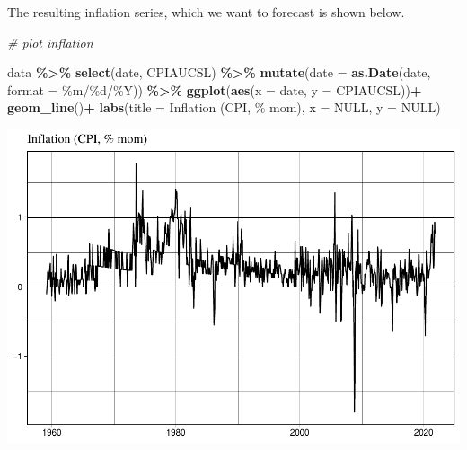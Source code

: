 \documentclass[
]{article}
\newenvironment{Shaded}{\begin{snugshade}}{\end{snugshade}}
\newcommand{\AttributeTok}[1]{\textcolor[rgb]{0.13,0.29,0.53}{#1}}
\newcommand{\CommentTok}[1]{\textcolor[rgb]{0.56,0.35,0.01}{\textit{#1}}}
\newcommand{\ConstantTok}[1]{\textcolor[rgb]{0.56,0.35,0.01}{#1}}
\newcommand{\DecValTok}[1]{\textcolor[rgb]{0.00,0.00,0.81}{#1}}
\newcommand{\FunctionTok}[1]{\textcolor[rgb]{0.13,0.29,0.53}{\textbf{#1}}}
\newcommand{\NormalTok}[1]{#1}
\newcommand{\OtherTok}[1]{\textcolor[rgb]{0.56,0.35,0.01}{#1}}
\newcommand{\SpecialCharTok}[1]{\textcolor[rgb]{0.81,0.36,0.00}{\textbf{#1}}}
\newcommand{\StringTok}[1]{\textcolor[rgb]{0.31,0.60,0.02}{#1}}
\begin{document}
\begin{Shaded}
\end{Shaded}

The resulting inflation series, which we want to forecast is shown
below.

\begin{Shaded}
\begin{Highlighting}[]
\CommentTok{\# plot inflation}

\NormalTok{data }\SpecialCharTok{\%\textgreater{}\%} 
  \FunctionTok{select}\NormalTok{(date, CPIAUCSL) }\SpecialCharTok{\%\textgreater{}\%}
  \FunctionTok{mutate}\NormalTok{(}\AttributeTok{date =} \FunctionTok{as.Date}\NormalTok{(date, }\AttributeTok{format =} \StringTok{\textquotesingle{}\%m/\%d/\%Y\textquotesingle{}}\NormalTok{)) }\SpecialCharTok{\%\textgreater{}\%}
  \FunctionTok{ggplot}\NormalTok{(}\FunctionTok{aes}\NormalTok{(}\AttributeTok{x =}\NormalTok{ date, }\AttributeTok{y =}\NormalTok{ CPIAUCSL))}\SpecialCharTok{+}
  \FunctionTok{geom\_line}\NormalTok{()}\SpecialCharTok{+}
  \FunctionTok{labs}\NormalTok{(}\AttributeTok{title =} \StringTok{\textquotesingle{}Inflation (CPI, \% mom)\textquotesingle{}}\NormalTok{, }\AttributeTok{x =} \ConstantTok{NULL}\NormalTok{, }\AttributeTok{y =} \ConstantTok{NULL}\NormalTok{)}
\end{Highlighting}
\end{Shaded}

\includegraphics{Trabalho_Econo4_Q2_files/figure-latex/unnamed-chunk-5-1.pdf}
\end{document}
